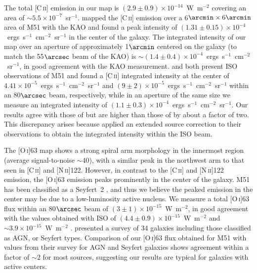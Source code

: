 \documentclass[preprint2]{aastex}
\begin{document}
The total [C\,\textsc{ii}] emission in our map is $(2.9 \pm 0.9) \times 10^{-14}$~W~m$^{-2}$ covering an area of $\sim5.5 \times 10^{-7}$~sr$^{-1}$.  \citet{2001ApJ...561..203N} mapped the [C\,\textsc{ii}] emission over a 6$\arcmin \times 6\arcmin$ area of M51 with the KAO and found a peak intensity of $(1.31 \pm 0.15) \times 10^{-4}$~ergs~s$^{-1}$~cm$^{-2}$~sr$^{-1}$ in the center of the galaxy.  The integrated intensity of our map over an aperture of approximately 1$\arcmin$ centered on the galaxy (to match the 55$\arcsec$ beam of the KAO) is $\sim (1.4 \pm 0.4) \times 10^{-4}$~ergs~s$^{-1}$~cm$^{-2}$~sr$^{-1}$, in good agreement with the KAO measurement.  \citet{2005A&A...441..961K} and \citet{2001A&A...375..566N} both present ISO observations of M51 and found a [C\,\textsc{ii}] integrated intensity at the center of $4.41 \times 10^{-5}$~ergs~s$^{-1}$~cm$^{-2}$~sr$^{-1}$ and $(9 \pm 2) \times 10^{-5}$~ergs~s$^{-1}$~cm$^{-2}$~sr$^{-1}$ within an 80$\arcsec$ beam, respectively, while in an aperture of the same size we measure an integrated intensity of $(1.1 \pm 0.3) \times 10^{-4}$~ergs~s$^{-1}$~cm$^{-2}$~sr$^{-1}$.  Our results agree with those of \citet{2001A&A...375..566N} but are higher than those of \citet{2005A&A...441..961K} by about a factor of two.  This discrepancy arises because \citet{2005A&A...441..961K} applied an extended source correction to their observations to obtain the integrated intensity within the ISO beam.

The [O\,\textsc{i}]63 map shows a strong spiral arm morphology in the innermost region (average signal-to-noise $\sim$40), with a similar peak in the northwest arm to that seen in [C\,\textsc{ii}] and [N\,\textsc{ii}]122.  However, in contrast to the [C\,\textsc{ii}] and [N\,\textsc{ii}]122 emission, the [O\,\textsc{i}]63 emission peaks prominently in the center of the galaxy.  M51 has been classified as a Seyfert~2 \citep{1997ApJS..112..315H}, and thus we believe the peaked emission in the center may be due to a low-luminosity active nucleus.  We measure a total [O\,\textsc{i}]63 flux within an 80$\arcsec$ beam of $(3 \pm 1) \times 10^{-15}$~W~m$^{-2}$, in good agreement with the values obtained with ISO of $(4.4 \pm 0.9) \times 10^{-15}$~W~m$^{-2}$ \citep{2001A&A...375..566N} and $\sim3.9 \times 10^{-15}$~W~m$^{-2}$ \citep{2005A&A...441..961K}.  \citet{2001A&A...375..566N} presented a survey of 34 galaxies including those classified as AGN, or Seyfert types.  Comparison of our [O\,\textsc{i}]63 flux obtained for M51 with values from their survey for AGN and Seyfert galaxies shows agreement within a factor of $\sim2$ for most sources, suggesting our results are typical for galaxies with active centers.
\end{document}
